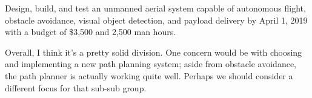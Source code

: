 
Design, build, and test an unmanned aerial system capable of autonomous flight, obstacle avoidance, visual object detection, and payload delivery by April 1, 2019 with a budget of \$3,500 and 2,500 man hours. 

Overall, I think it’s a pretty solid division. One concern would be with choosing and implementing a new path planning system; aside from obstacle avoidance, the path planner is actually working quite well. Perhaps we should consider a different focus for that sub-sub group.
